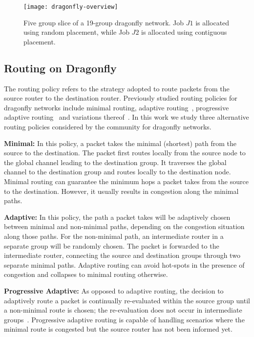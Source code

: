 \begin{figure}[h!] 
  \centering
  \texttt{[image: dragonfly-overview]}
  \caption{Five group slice of a 19-group dragonfly network. Job $J1$ is allocated using random placement, while Job $J2$ is allocated using contiguous placement.}
  \label{fig:dragonfly-overview}
\end{figure}


\subsection{Routing on Dragonfly}
\label{sec:routing-schemes}

The routing policy refers to the strategy adopted to route  packets from the source router to the destination router. Previously studied routing policies for dragonfly networks include minimal routing, adaptive routing~\cite{dally-dragonfly}, progressive adaptive routing~\cite{jiang} and variations thereof~\cite{won-prog-adaptive}. In this work we study three alternative routing policies considered by the community for dragonfly networks.

\textbf{Minimal:} In this policy, a packet takes the minimal (shortest) path from the source to the destination. The packet first routes locally from the source node to the global channel leading to the destination group. It traverses the global channel to the destination group and routes locally to the destination node. 
Minimal routing can guarantee the minimum hops a packet takes from the source to the destination. However, it usually results in congestion along the minimal paths. 

\textbf{Adaptive:} In this policy, the path a packet takes will be adaptively chosen between minimal and non-minimal paths, depending on the congestion situation along those paths. For the non-minimal path, an intermediate router in a separate group will be randomly chosen. The packet is forwarded to the intermediate router, connecting the source and destination groups through two separate minimal paths. Adaptive routing can avoid hot-spots in the presence of congestion and collapses to minimal routing otherwise. 

\textbf{Progressive Adaptive:} As opposed to adaptive routing, the decision to adaptively route a packet is continually re-evaluated within the source group until a non-minimal route is chosen; the re-evaluation does not occur in intermediate groups~\cite{jiang}.
Progressive adaptive routing is capable of handling scenarios where the minimal route is congested but the source router has not been informed yet.




